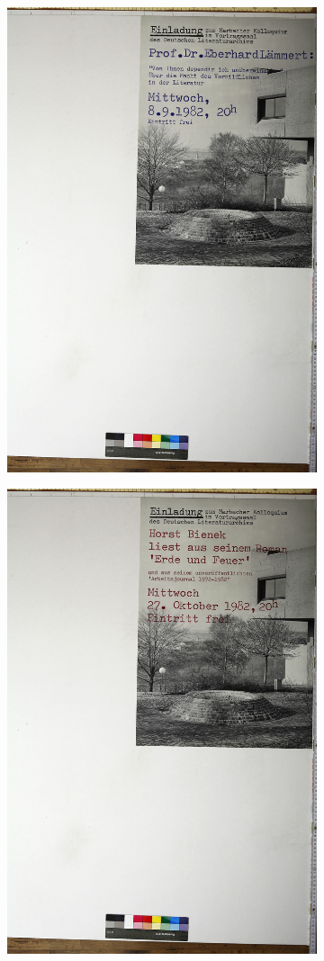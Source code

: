 \documentclass[a4paper,12pt,ngerman]{article}
\begin{document}
\newpage
\begin{landscape}
\begin{figure}[ht]
	\begin{subfigure}[b]{0.5\linewidth}
	\centering
	\includegraphics[height=\linewidth]{Abbildung_4a_(acht3_212)}
	\end{subfigure}
	\begin{subfigure}[b]{0.5\linewidth}
	\centering
	\includegraphics[height=\linewidth]{Abbildung_4b_(acht3_213)}

\end{subfigure}
\end{figure}
\end{landscape}
\end{document}

